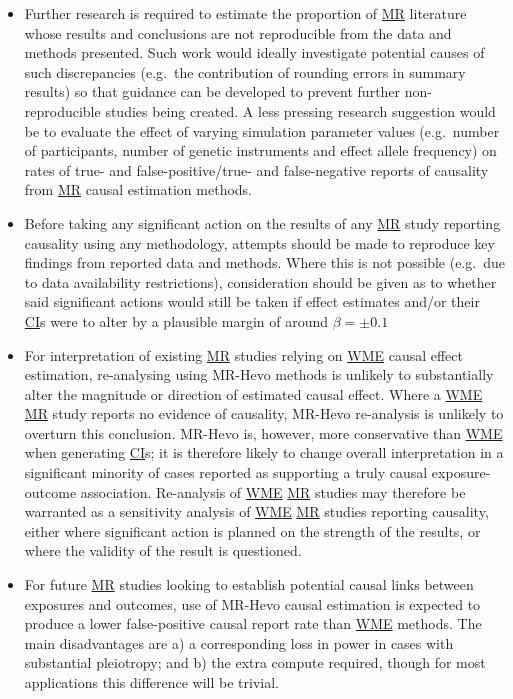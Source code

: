 \documentclass[
]{article}
\begin{document}
\begin{itemize}
\item
  Further research is required to estimate the proportion of \hyperref[acronyms_MR]{MR} literature whose results and conclusions are not reproducible from the data and methods presented. Such work would ideally investigate potential causes of such discrepancies (e.g.~the contribution of rounding errors in summary results) so that guidance can be developed to prevent further non-reproducible studies being created. A less pressing research suggestion would be to evaluate the effect of varying simulation parameter values (e.g.~number of participants, number of genetic instruments and effect allele frequency) on rates of true- and false-positive/true- and false-negative reports of causality from \hyperref[acronyms_MR]{MR} causal estimation methods.
\item
  Before taking any significant action on the results of any \hyperref[acronyms_MR]{MR} study reporting causality using any methodology, attempts should be made to reproduce key findings from reported data and methods. Where this is not possible (e.g.~due to data availability restrictions), consideration should be given as to whether said significant actions would still be taken if effect estimates and/or their \hyperref[acronyms_CI]{CI}s were to alter by a plausible margin of around \(\beta = \pm 0.1\)
\item
  For interpretation of existing \hyperref[acronyms_MR]{MR} studies relying on \hyperref[acronyms_WME]{WME} causal effect estimation, re-analysing using MR-Hevo methods is unlikely to substantially alter the magnitude or direction of estimated causal effect. Where a \hyperref[acronyms_WME]{WME} \hyperref[acronyms_MR]{MR} study reports no evidence of causality, MR-Hevo re-analysis is unlikely to overturn this conclusion. MR-Hevo is, however, more conservative than \hyperref[acronyms_WME]{WME} when generating \hyperref[acronyms_CI]{CI}s; it is therefore likely to change overall interpretation in a significant minority of cases reported as supporting a truly causal exposure-outcome association. Re-analysis of \hyperref[acronyms_WME]{WME} \hyperref[acronyms_MR]{MR} studies may therefore be warranted as a sensitivity analysis of \hyperref[acronyms_WME]{WME} \hyperref[acronyms_MR]{MR} studies reporting causality, either where significant action is planned on the strength of the results, or where the validity of the result is questioned.
\item
  For future \hyperref[acronyms_MR]{MR} studies looking to establish potential causal links between exposures and outcomes, use of MR-Hevo causal estimation is expected to produce a lower false-positive causal report rate than \hyperref[acronyms_WME]{WME} methods. The main disadvantages are a) a corresponding loss in power in cases with substantial pleiotropy; and b) the extra compute required, though for most applications this difference will be trivial.
\end{itemize}
\end{document}

